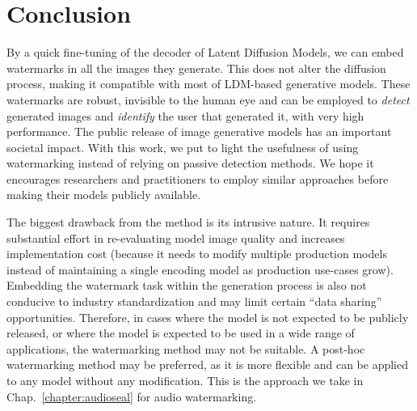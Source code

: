 
\section{Conclusion}\label{chap3/sec:conclusion}

By a quick fine-tuning of the decoder of Latent Diffusion Models, we can embed watermarks in all the images they generate.
This does not alter the diffusion process, making it compatible with most of LDM-based generative models.
These watermarks are robust, invisible to the human eye and can be employed to \emph{detect} generated images and \emph{identify} the user that generated it, with very high performance.
The public release of image generative models has an important societal impact.
With this work, we put to light the usefulness of using watermarking instead of relying on passive detection methods.
We hope it encourages researchers and practitioners to employ similar approaches before making their models publicly available.

The biggest drawback from the method is its intrusive nature.
It requires substantial effort in re-evaluating model image quality and increases implementation cost (because it needs to modify multiple production models instead of maintaining a single encoding model as production use-cases grow).
Embedding the watermark task within the generation process is also not conducive to industry standardization and may limit certain ``data sharing'' opportunities.
Therefore, in cases where the model is not expected to be publicly released, or where the model is expected to be used in a wide range of applications, the watermarking method may not be suitable. 
A post-hoc watermarking method may be preferred, as it is more flexible and can be applied to any model without any modification.
This is the approach we take in Chap.~\ref{chapter:audioseal} for audio watermarking.



